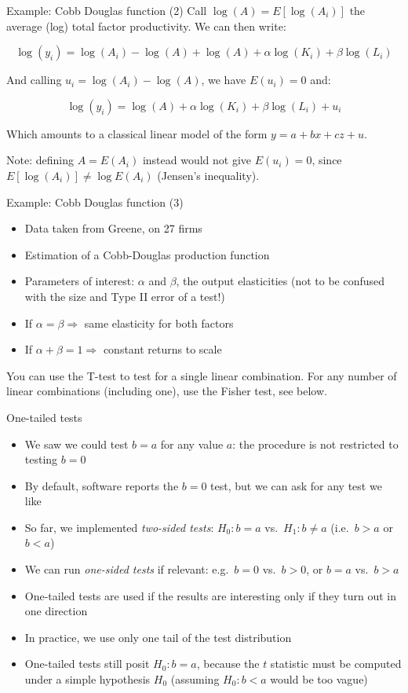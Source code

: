 \documentclass[aspectratio=169]{beamer}
\begin{document}
\begin{frame}{Example: Cobb Douglas function (2)}
Call $\log(A) = E[\log(A_i)]$ the average (log) total factor productivity. We can then write:

\[
\log(y_i) = \log(A_i) - \log(A) + \log(A) + \alpha \log(K_i) + \beta \log(L_i)
\]

And calling $u_i = \log(A_i) - \log(A)$, we have $E(u_i) = 0$ and:

\[
\log(y_i) = \log(A) + \alpha \log(K_i) + \beta \log(L_i) + u_i
\]

Which amounts to a classical linear model of the form $y = a + bx + cz + u$.

Note: defining $A = E(A_i)$ instead would not give $E(u_i) = 0$, since $E[\log(A_i)] \neq \log E(A_i)$ (Jensen's inequality).
\end{frame}

\begin{frame}{Example: Cobb Douglas function (3)}
\begin{itemize}
    \item Data taken from Greene, on 27 firms
    \item Estimation of a Cobb-Douglas production function
    \item Parameters of interest: $\alpha$ and $\beta$, the output elasticities (not to be confused with the size and Type II error of a test!)
    \item If $\alpha = \beta \Rightarrow$ same elasticity for both factors
    \item If $\alpha + \beta = 1 \Rightarrow$ constant returns to scale
\end{itemize}

You can use the T-test to test for a single linear combination. For any number of linear combinations (including one), use the Fisher test, see below.
\end{frame}

\begin{frame}{One-tailed tests}
\begin{itemize}
    \item We saw we could test $b = a$ for any value $a$: the procedure is not restricted to testing $b = 0$
    \item By default, software reports the $b = 0$ test, but we can ask for any test we like
    \item So far, we implemented \textit{two-sided tests}: $H_0: b = a$ vs.\ $H_1: b \neq a$ (i.e.\ $b > a$ or $b < a$)
    \item We can run \textit{one-sided tests} if relevant: e.g.\ $b = 0$ vs.\ $b > 0$, or $b = a$ vs.\ $b > a$
    \item One-tailed tests are used if the results are interesting only if they turn out in one direction
    \item In practice, we use only one tail of the test distribution
    \item One-tailed tests still posit $H_0: b = a$, because the $t$ statistic must be computed under a simple hypothesis $H_0$ (assuming $H_0: b < a$ would be too vague)
\end{itemize}
\end{frame}
\end{document}
